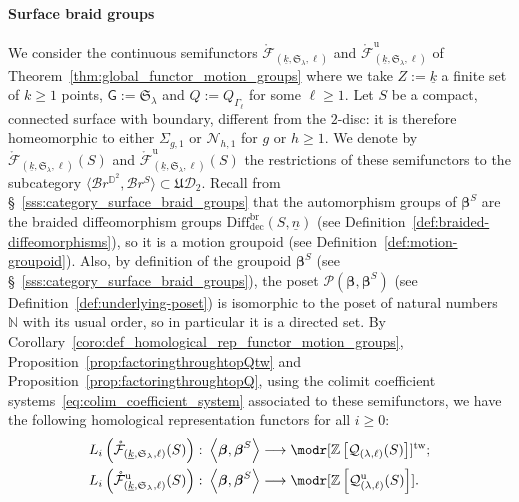 \documentclass[AHL,Unicode,published]{cedram}
\newcommand{\Int}{\mathring}
\newcommand{\tw}{\mathrm{tw}}
\newcommand{\unt}{\mathrm{u}}
\newcommand{\rdec}{\mathrm{dec}}
\newcommand{\LCS}{\varGamma}
\newcommand{\Sym}{\mathfrak{S}}
\newcommand{\fU}{\ensuremath{\mathfrak{U}}}
\newcommand{\N}{\mathscr{N}}
\newcommand{\sG}{\mathsf{G}}
\newcommand{\cB}{\mathcal{B}}
\newcommand{\cD}{\mathcal{D}}
\newcommand{\cF}{\mathcal{F}}
\newcommand{\cP}{\mathcal{P}}
\newcommand{\cQ}{\mathcal{Q}}
\newcommand{\bD}{\mathbb{D}}
\newcommand{\bN}{\mathbb{N}}
\newcommand{\bZ}{\mathbb{Z}}
\newcommand{\too}{\ensuremath{\longrightarrow}}
\newcommand{\diffdecbr}{\ensuremath{\mathrm{Diff}_{\rdec}^{\mathrm{br}}}}
\newcommand{\Beta}{\boldsymbol{\beta}}
\renewcommand{\geq}{\geqslant}
\begin{document}
\paragraph*{Surface braid groups}
We consider the continuous semifunctors $\Int{\cF}_{(\underline{k},\Sym_{\lambda},\ell)}$ and $\Int{\cF}^{\unt}_{(\underline{k},\Sym_{\lambda},\ell)}$ of Theorem~\ref{thm:global_functor_motion_groups} where we take $Z:=\underline{k}$ a finite set of $k\geq 1$ points, $\sG:=\Sym_{\lambda}$ and $Q:=Q_{\LCS_{\ell}}$ for some $\ell\geq 1$. Let $S$ be a compact, connected surface with boundary, different from the $2$-disc: it is therefore homeomorphic to either $\Sigma_{g,1}$ or $\N_{h,1}$ for $g \text{ or } h\geq 1$. We denote by $\Int{\cF}_{(\underline{k},\Sym_{\lambda},\ell)}(S)$ and $\Int{\cF}^{\unt}_{(\underline{k},\Sym_{\lambda},\ell)}(S)$ the restrictions of these semifunctors to the subcategory $\langle\cB r^{\bD^{2}},\cB r^{S}\rangle \subset \fU\cD_{2}$. Recall from \S~\ref{sss:category_surface_braid_groups} that the automorphism groups of $\Beta^{S}$ are the braided diffeomorphism groups $\diffdecbr(S,\underline{n})$ (see Definition~\ref{def:braided-diffeomorphisms}), so it is a motion groupoid (see Definition~\ref{def:motion-groupoid}). Also, by definition of the groupoid $\Beta^{S}$ (see \S~\ref{sss:category_surface_braid_groups}), the poset $\cP(\Beta,\Beta^{S})$ (see Definition~\ref{def:underlying-poset}) is isomorphic to the poset of natural numbers $\bN$ with its usual order, so in particular it is a directed set. By Corollary~\ref{coro:def_homological_rep_functor_motion_groups}, Proposition~\ref{prop:factoringthroughtopQtw} and Proposition~\ref{prop:factoringthroughtopQ}, using the colimit coefficient systems~\eqref{eq:colim_coefficient_system} associated to these semifunctors, we have the following homological representation functors for all $i\geq 0$:
\begin{equation}\label{eq:output_of_general_construction_surface_braids}
\begin{split}
L_{i}\left(\Int{\cF}_{\left(\underline{k},\Sym_{\lambda},\ell\right)}(S)\right) \colon \left\langle \Beta,\Beta^{S}\right\rangle &\too \modr[\bZ\left[\cQ_{(\lambda,\ell)}(S)\right]]^{\tw}; \\
L_{i}\left(\Int{\cF}^{\unt}_{\left(\underline{k},\Sym_{\lambda},\ell\right)}(S)\right) \colon \left\langle \Beta,\Beta^{S}\right\rangle &\too \modr[\bZ\left[\cQ^{\unt}_{(\lambda,\ell)}(S)\right]].
\end{split}
\end{equation}
\end{document}
